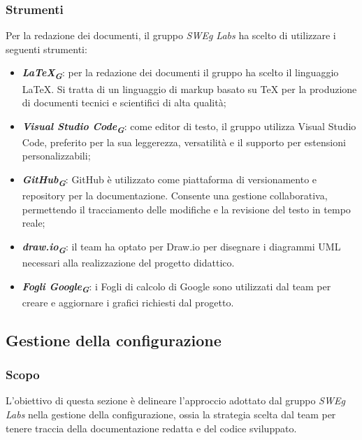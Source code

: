 \subsubsection{Strumenti}
Per la redazione dei documenti, il gruppo \emph{SWEg Labs} ha scelto di utilizzare i seguenti strumenti:
\begin{itemize}
    \item \textbf{\emph{\LaTeX}}\textsubscript{\textit{\textbf{G}}}: per la redazione dei documenti il gruppo ha scelto il linguaggio \LaTeX. Si tratta
    di un linguaggio di markup basato su TeX per la produzione di documenti tecnici e scientifici di alta qualità;
    \item \textbf{\emph{Visual Studio Code}}\textsubscript{\textit{\textbf{G}}}: come editor di testo, il gruppo utilizza Visual Studio Code, 
    preferito per la sua leggerezza, versatilità e il supporto per estensioni personalizzabili;
    \item \textbf{\emph{GitHub}}\textsubscript{\textit{\textbf{G}}}: GitHub è utilizzato come piattaforma di versionamento e repository per la documentazione. 
    Consente una gestione collaborativa, permettendo il tracciamento delle modifiche e la revisione del testo in tempo reale;
    \item \textbf{\emph{draw.io}}\textsubscript{\textit{\textbf{G}}}: il team ha optato per Draw.io per disegnare i diagrammi UML necessari
    alla realizzazione del progetto didattico.
    \item \textbf{\emph{Fogli Google}}\textsubscript{\textit{\textbf{G}}}: i Fogli di calcolo di Google sono utilizzati dal team per creare e 
    aggiornare i grafici richiesti dal progetto.
\end{itemize}




\subsection{Gestione della configurazione}
\label{sec:gestione_configurazione}

\subsubsection{Scopo}
L’obiettivo di questa sezione è delineare l’approccio adottato dal gruppo \emph{SWEg Labs} nella 
gestione della configurazione, ossia la strategia scelta dal team per tenere traccia della
documentazione redatta e del codice sviluppato.

